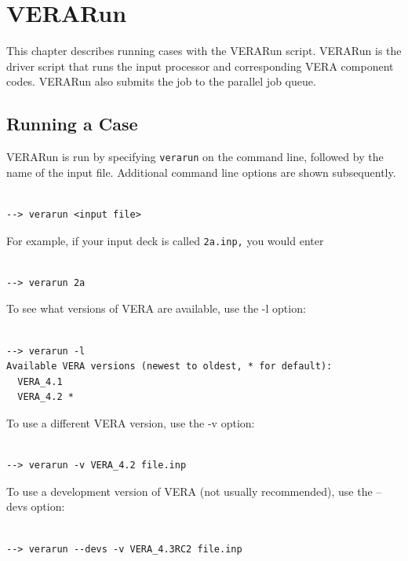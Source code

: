%
%
%
\section{VERARun}  \label{chap:verarun}

This chapter describes running cases with the VERARun script.
VERARun is the driver script that runs the input processor and corresponding VERA component codes.
VERARun also submits the job to the parallel job queue.

\subsection{Running a Case}

VERARun is run by specifying {\tt verarun} on the command line, followed by the name of the input file.
Additional command line options are shown subsequently.
\begin{Verbatim}[fontsize=\small]

--> verarun <input file>

\end{Verbatim}

For example, if your input deck is called \texttt{2a.inp,} you would enter
\begin{Verbatim}[fontsize=\small]

--> verarun 2a

\end{Verbatim}

To see what versions of VERA are available, use the -l option:
\begin{Verbatim}[fontsize=\small]

--> verarun -l
Available VERA versions (newest to oldest, * for default):
  VERA_4.1
  VERA_4.2 *

\end{Verbatim}

To use a different VERA version, use the -v option:
\begin{Verbatim}[fontsize=\small]

--> verarun -v VERA_4.2 file.inp

\end{Verbatim}

To use a development version of VERA (not usually recommended), use the --devs option:
\begin{Verbatim}[fontsize=\small]

--> verarun --devs -v VERA_4.3RC2 file.inp

\end{Verbatim}

